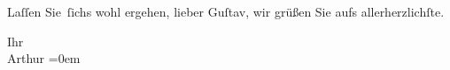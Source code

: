 \pstart
           Laſſen Sie ſichs wohl ergehen, lieber Guſtav,
      wir grüßen Sie aufs allerherzlichſte.\pend
           
\pstart
           Ihr{\\[\baselineskip]}\spacefill\mbox{Arthur}\pend
           \leftskip=0em{}\endnumbering{}
\begin{anhang}
\end{anhang}\newcommand{\dateiname}{L04158}\newcommand{\titel}{Arthur Schnitzler an Gustav Schwarzkopf, 24. 2. 1920}\newcommand{\editorInnen}{Herausgegeben von Jahnke, SelmaMüller, Martin Anton}
